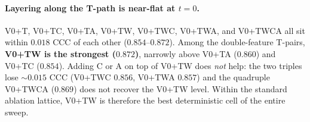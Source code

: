 \paragraph{Layering along the T-path is near-flat at $t = 0$.}
V0+T, V0+TC, V0+TA, V0+TW, V0+TWC, V0+TWA, and V0+TWCA all sit
within $0.018$ CCC of each other ($0.854$--$0.872$). Among the
double-feature T-pairs, \textbf{V0+TW is the strongest ($0.872$)},
narrowly above V0+TA ($0.860$) and V0+TC ($0.854$). Adding C or A
on top of V0+TW does \emph{not} help: the two triples lose
$\sim\!0.015$ CCC (V0+TWC $0.856$, V0+TWA $0.857$) and the
quadruple V0+TWCA ($0.869$) does not recover the V0+TW level.
Within the standard ablation lattice, V0+TW is therefore the best
deterministic cell of the entire sweep.

